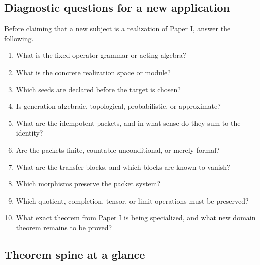 \subsection{Diagnostic questions for a new application}
Before claiming that a new subject is a realization of Paper I, answer the following.
\begin{enumerate}
\item What is the fixed operator grammar or acting algebra?
\item What is the concrete realization space or module?
\item Which seeds are declared before the target is chosen?
\item Is generation algebraic, topological, probabilistic, or approximate?
\item What are the idempotent packets, and in what sense do they sum to the identity?
\item Are the packets finite, countable unconditional, or merely formal?
\item What are the transfer blocks, and which blocks are known to vanish?
\item Which morphisms preserve the packet system?
\item Which quotient, completion, tensor, or limit operations must be preserved?
\item What exact theorem from Paper I is being specialized, and what new domain theorem remains to be proved?
\end{enumerate}

\subsection{Theorem spine at a glance}

